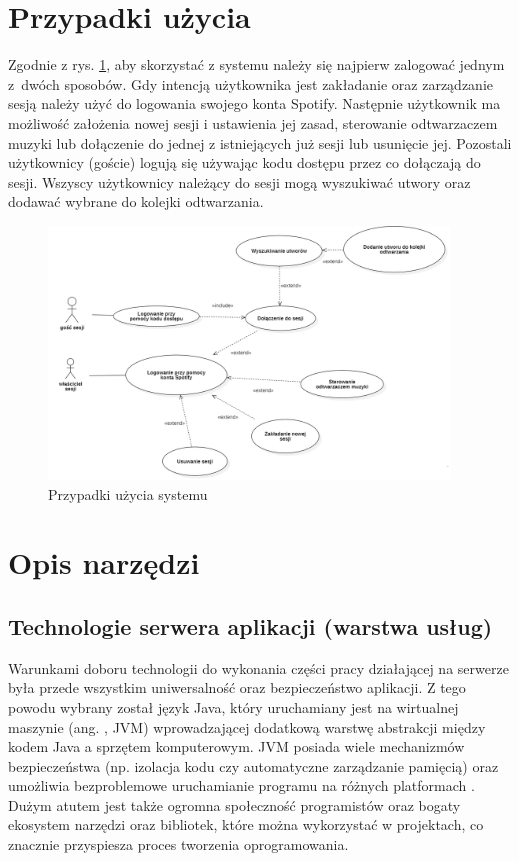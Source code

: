 \section{Przypadki użycia}
Zgodnie z rys. \ref{fig:use-case}, aby skorzystać z systemu należy się najpierw zalogować jednym z~dwóch sposobów. Gdy intencją użytkownika jest zakładanie oraz zarządzanie sesją należy użyć do logowania swojego konta Spotify. Następnie użytkownik ma możliwość założenia nowej sesji i ustawienia jej zasad, sterowanie odtwarzaczem muzyki lub dołączenie do jednej z istniejących już sesji lub usunięcie jej. Pozostali użytkownicy (goście) logują się używając kodu dostępu przez co dołączają do sesji. Wszyscy użytkownicy należący do sesji mogą wyszukiwać utwory oraz dodawać wybrane do kolejki odtwarzania.
\begin{figure}[h]
\centering
\includegraphics[width=0.95\textwidth]{./graf/przypadki_uzycia.PNG}
\caption{Przypadki użycia systemu}
\label{fig:use-case}
\end{figure}



\section{Opis narzędzi}

\subsection{Technologie serwera aplikacji (warstwa usług)}
Warunkami doboru technologii do wykonania części pracy działającej na serwerze była przede wszystkim uniwersalność oraz bezpieczeństwo aplikacji. Z tego powodu wybrany został język Java, który uruchamiany jest na wirtualnej maszynie (ang. , JVM) wprowadzającej dodatkową warstwę abstrakcji między kodem Java a sprzętem komputerowym. JVM posiada wiele mechanizmów bezpieczeństwa (np. izolacja kodu czy automatyczne zarządzanie pamięcią) oraz umożliwia bezproblemowe uruchamianie programu na różnych platformach \cite{bib:java_virtual_machine}. Dużym atutem jest także ogromna społeczność programistów oraz bogaty ekosystem narzędzi oraz bibliotek, które można wykorzystać w projektach, co znacznie przyspiesza proces tworzenia oprogramowania.

